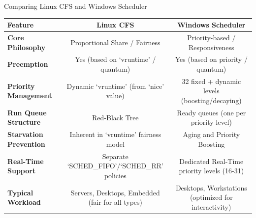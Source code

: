 \documentclass[aspectratio=169,11pt]{beamer}
\begin{document}
\begin{frame}{Comparing Linux CFS and Windows Scheduler}
  \small
  \resizebox{\textwidth}{!}
  {
  \begin{tabular}{|l|c|c|}
  \hline
  \textbf{Feature} & \textbf{Linux CFS} & \textbf{Windows Scheduler} \\
  \hline
  \textbf{Core Philosophy} & Proportional Share / Fairness & Priority-based / Responsiveness \\
  \textbf{Preemption} & Yes (based on `vruntime' / quantum) & Yes (based on priority / quantum) \\
  \textbf{Priority Management} & Dynamic `vruntime' (from `nice' value) & 32 fixed + dynamic levels (boosting/decaying) \\
  \textbf{Run Queue Structure} & Red-Black Tree & Ready queues (one per priority level) \\
  \textbf{Starvation Prevention} & Inherent in `vruntime' fairness model & Aging and Priority Boosting \\
  \textbf{Real-Time Support} & Separate `SCHED\_FIFO'/`SCHED\_RR' policies & Dedicated Real-Time priority levels (16-31) \\
  \textbf{Typical Workload} & Servers, Desktops, Embedded (fair for all types) & Desktops, Workstations (optimized for interactivity) \\
  \hline
  \end{tabular}
  }
\end{frame}

\fi
\end{document}
